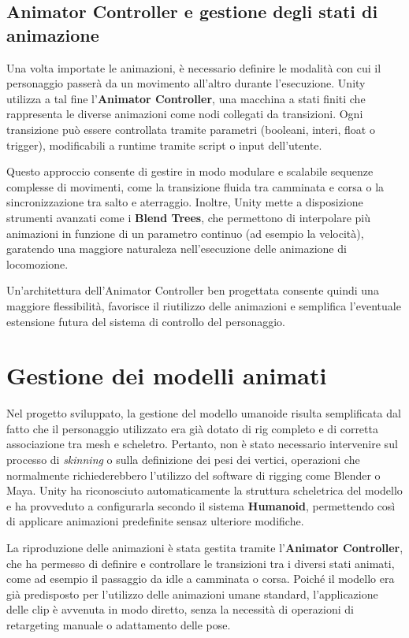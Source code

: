 \subsection{Animator Controller e gestione degli stati di animazione}

Una volta importate le animazioni, è necessario definire le modalità con cui il personaggio passerà da un movimento all'altro durante l'esecuzione. Unity utilizza a tal fine l'\textbf{Animator Controller}, una macchina a stati finiti che rappresenta le diverse animazioni come nodi collegati da transizioni. Ogni transizione può essere controllata tramite parametri (booleani, interi, float o trigger), modificabili a runtime tramite script o input dell'utente.

Questo approccio consente di gestire in modo modulare e scalabile sequenze complesse di movimenti, come la transizione fluida tra camminata e corsa o la sincronizzazione tra salto e aterraggio. Inoltre, Unity mette a disposizione strumenti avanzati come i \textbf{Blend Trees}, che permettono di interpolare più animazioni in funzione di un parametro continuo (ad esempio la velocità), garatendo una maggiore naturaleza nell'esecuzione delle animazione di locomozione.

Un'architettura dell'Animator Controller ben progettata consente quindi una maggiore flessibilità, favorisce il riutilizzo delle animazioni e semplifica l'eventuale estensione futura del sistema di controllo del personaggio.

\section{Gestione dei modelli animati}

Nel progetto sviluppato, la gestione del modello umanoide risulta semplificata dal fatto che il personaggio utilizzato era già dotato di rig completo e di corretta associazione tra mesh e scheletro. Pertanto, non è stato necessario intervenire sul processo di \textit{skinning} o sulla definizione dei pesi dei vertici, operazioni che normalmente richiederebbero l'utilizzo del software di rigging come Blender o Maya. Unity ha riconosciuto automaticamente la struttura scheletrica del modello e ha provveduto  a configurarla secondo il sistema \textbf{Humanoid}, permettendo così di applicare animazioni predefinite sensaz ulteriore modifiche.

La riproduzione delle animazioni è stata gestita tramite l'\textbf{Animator Controller}, che ha permesso di definire e controllare le transizioni tra i diversi stati animati, come ad esempio il passaggio da idle a camminata o corsa. Poiché il modello era già predisposto per l'utilizzo delle animazioni umane standard, l'applicazione delle clip è avvenuta in modo diretto, senza la necessità di operazioni di retargeting manuale o adattamento delle pose.

